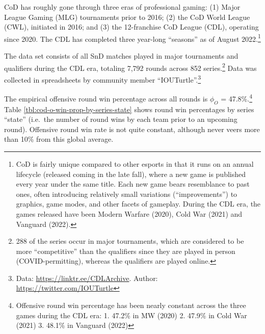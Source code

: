 \documentclass{article}
\begin{document}
CoD has roughly gone through three eras of professional gaming: (1)
Major League Gaming (MLG) tournaments prior to 2016; (2) the CoD World
League (CWL), initiated in 2016; and (3) the 12-franchise CoD League
(CDL), operating since 2020. The CDL has completed three year-long
``seasons'' as of August 2022.\footnote{CoD is fairly unique compared to
  other esports in that it runs on an annual lifecycle (released coming
  in the late fall), where a new game is published every year under the
  same title. Each new game bears resemblance to past ones, often
  introducing relatively small variations (``improvements'') to
  graphics, game modes, and other facets of gameplay. During the CDL
  era, the games released have been Modern Warfare (2020), Cold War
  (2021) and Vanguard (2022).}

The data set consists of all SnD matches played in major tournaments and
qualifiers during the CDL era, totaling 7,792 rounds across 852
series.\footnote{288 of the series occur in major tournaments, which are
  considered to be more ``competitive'' than the qualifiers since they
  are played in person (COVID-permitting), whereas the qualifiers are
  played online.} Data was collected in spreadsheets by community member
``IOUTurtle''.\footnote{Data: \url{https://linktr.ee/CDLArchive}.
  Author: \url{https://twitter.com/IOUTurtle}}

The empirical offensive round win percentage across all rounds is
\(\phi_O\) = 47.8\%.\footnote{Offensive round win percentage has been
  nearly constant across the three games during the CDL era: 1. 47.2\%
  in MW (2020) 2. 47.9\% in Cold War (2021) 3. 48.1\% in Vanguard (2022)}
Table \ref{tbl:cod-o-win-prop-by-series-state} shows round win
percentages by series ``state'' (i.e.~the number of round wins by each
team prior to an upcoming round). Offensive round win rate is not quite
constant, although never veers more than 10\% from this global average.
\end{document}
